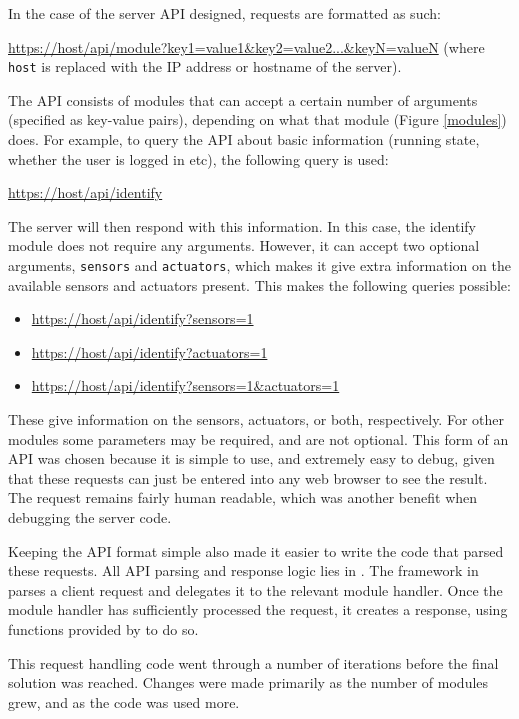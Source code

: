 In the case of the server API designed, requests are formatted as such: 

\url{https://host/api/module?key1=value1&key2=value2...&keyN=valueN} (where \verb/host/ is replaced with the IP address or hostname of the server).


The API consists of modules that can accept a certain number of arguments (specified as key-value pairs), depending on what that module (Figure \ref{modules}) does. For example, to query the API about basic information (running state, whether the user is logged in etc), the following query is used:

\url{https://host/api/identify}

The server will then respond with this information. In this case, the identify module does not require any arguments. However, it can accept two optional arguments, \texttt{sensors} and \texttt{actuators}, which makes it give extra information on the available sensors and actuators present. This makes the following queries possible:

\begin{itemize}
	\item \url{https://host/api/identify?sensors=1}
	\item \url{https://host/api/identify?actuators=1}
	\item \url{https://host/api/identify?sensors=1&actuators=1}
\end{itemize}

These give information on the sensors, actuators, or both, respectively. For other modules some parameters may be required, and are not optional.
This form of an API was chosen because it is simple to use, and extremely easy to debug, given that these requests can just be entered into any web browser to see the result. The request remains fairly human readable, which was another benefit when debugging the server code. 

Keeping the API format simple also made it easier to write the code that parsed these requests. All API parsing and response logic lies in . The framework in  parses a client request and delegates it to the relevant module handler. Once the module handler has sufficiently processed the request, it creates a response, using functions provided by  to do so. 

This request handling code went through a number of iterations before the final solution was reached. Changes were made primarily as the number of modules grew, and as the code was used more. 

